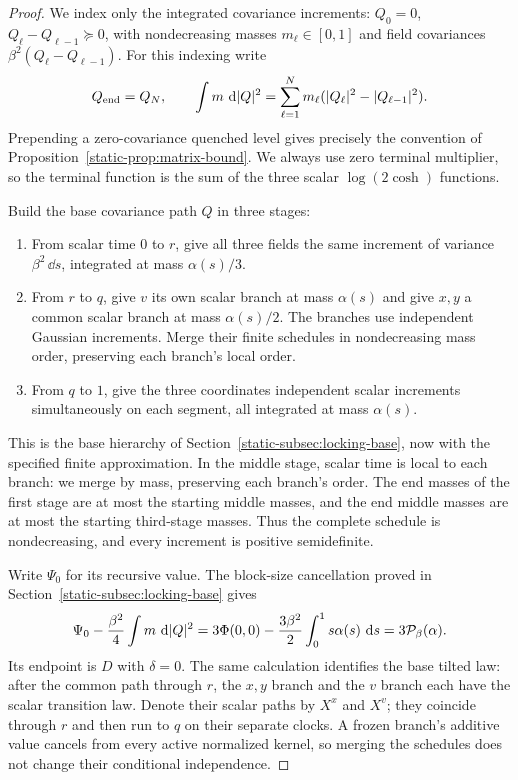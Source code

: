 \begin{proof}
We index only the integrated covariance increments: $Q_0=0$,
$Q_\ell-Q_{\ell-1}\succeq0$, with nondecreasing masses
$m_\ell\in[0,1]$ and field covariances
$\beta^2(Q_\ell-Q_{\ell-1})$. For this indexing write
\[
 Q_{\rm end}=Q_N,\qquad
 \int m\,\,\mathrm d|Q|^2
 =\sum_{\ell=1}^N m_\ell
       (|Q_\ell|^2-|Q_{\ell-1}|^2).
\]
Prepending a zero-covariance quenched level gives precisely the
convention of Proposition~\ref{static-prop:matrix-bound}. We always use
zero terminal multiplier, so the terminal function is the sum of the
three scalar $\log(2\cosh)$ functions.

Build the base covariance path $Q$ in three stages:
\begin{enumerate}
 \item From scalar time $0$ to $r$, give all three fields the same
       increment of variance $\beta^2\,\dd s$, integrated at mass
       $\alpha(s)/3$.
 \item From $r$ to $q$, give $v$ its own scalar branch at mass
       $\alpha(s)$ and give $x,y$ a common scalar branch at mass
       $\alpha(s)/2$. The branches use independent Gaussian
       increments. Merge their finite schedules in nondecreasing
       mass order, preserving each branch's local order.
 \item From $q$ to $1$, give the three coordinates independent
       scalar increments simultaneously on each segment, all
       integrated at mass $\alpha(s)$.
\end{enumerate}
This is the base hierarchy of
Section~\ref{static-subsec:locking-base}, now with the specified finite
approximation. In the middle stage, scalar time is local to each branch:
we merge by mass, preserving each branch's order. The end masses of the
first stage are at most the starting middle masses, and the end middle
masses are at most the starting third-stage masses. Thus the complete
schedule is nondecreasing, and every increment is positive semidefinite.

Write $\Psi_0$ for its recursive value. The block-size cancellation
proved in Section~\ref{static-subsec:locking-base} gives
\begin{equation}\label{eq:narrow-base-value}
 \Psi_0-\frac{\beta^2}{4}\int m\,\,\mathrm d|Q|^2
 =3\Phi(0,0)-\frac{3\beta^2}{2}\int_0^1s\alpha(s)\,\,\mathrm d s
 =3\mathcal P_\beta(\alpha).
\end{equation}
Its endpoint is $D$ with $\delta=0$. The same calculation identifies
the base tilted law: after the common path through $r$, the $x,y$
branch and the $v$ branch each have the scalar transition law. Denote
their scalar paths by $X^x$ and $X^v$; they coincide through $r$ and
then run to $q$ on their separate clocks. A frozen
branch's additive value cancels from every active normalized kernel,
so merging the schedules does not change their conditional independence.


\end{proof}

